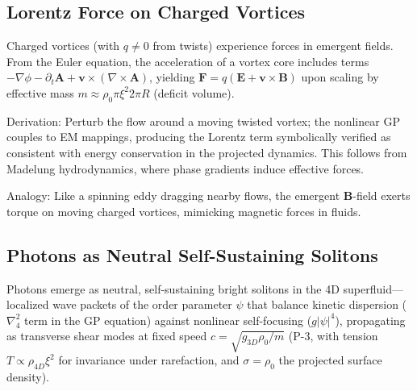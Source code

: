 \subsection{Lorentz Force on Charged Vortices}

Charged vortices (with $q \neq 0$ from twists) experience forces in emergent fields. From the Euler equation, the acceleration of a vortex core includes terms $-\nabla \phi - \partial_t \mathbf{A} + \mathbf{v} \times (\nabla \times \mathbf{A})$, yielding $\mathbf{F} = q (\mathbf{E} + \mathbf{v} \times \mathbf{B})$ upon scaling by effective mass $m \approx \rho_0 \pi \xi^2 2\pi R$ (deficit volume).

Derivation: Perturb the flow around a moving twisted vortex; the nonlinear GP couples to EM mappings, producing the Lorentz term symbolically verified as consistent with energy conservation in the projected dynamics. This follows from Madelung hydrodynamics, where phase gradients induce effective forces.

Analogy: Like a spinning eddy dragging nearby flows, the emergent $\mathbf{B}$-field exerts torque on moving charged vortices, mimicking magnetic forces in fluids.

\medskip
\noindent
{}
\medskip

\subsection{Photons as Neutral Self-Sustaining Solitons}

Photons emerge as neutral, self-sustaining bright solitons in the 4D superfluid---localized wave packets of the order parameter $\psi$ that balance kinetic dispersion ($\nabla_4^2$ term in the GP equation) against nonlinear self-focusing ($g |\psi|^4$), propagating as transverse shear modes at fixed speed $c = \sqrt{g_{3D} \rho_0 / m}$ (P-3, with tension $T \propto \rho_{4D} \xi^2$ for invariance under rarefaction, and $\sigma = \rho_0$ the projected surface density).

